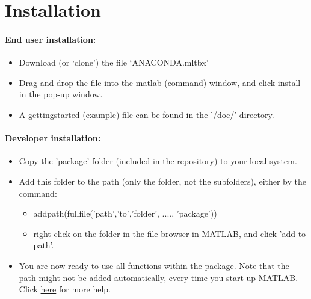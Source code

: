 \section{Installation}

\paragraph{End user installation:}
\begin{itemize}
\item Download (or `clone') the file `ANACONDA.mltbx'
\item Drag and drop the file into the matlab (command) window, and click install in the pop-up window.
\item A gettingstarted (example) file can be found in the '/doc/' directory.
\end{itemize}

\paragraph{Developer installation:}
\begin{itemize}
\item Copy the 'package' folder (included in the repository) to your local system.
\item Add this folder to the path (only the folder, not the subfolders), either by the command:
	\begin{itemize}
		\item addpath(fullfile('path','to','folder', ...., 'package'))
		\item right-click on the folder in the file browser in MATLAB, and click 'add to path'.
	\end{itemize}
\item You are now ready to use all functions within the package. Note that the path might not be added automatically, every time you start up MATLAB. Click \href{https://se.mathworks.com/help/matlab/ref/startup.html}{here} for more help.
\end{itemize}
